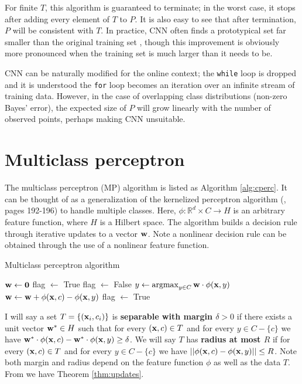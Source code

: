 \documentclass[preprint]{elsarticle}
\newcommand{\R}{ \mbox{${\mathbb R}$}}
\newcommand{\argmax}{\operatornamewithlimits{argmax}}
\begin{document}
For finite $T$, this algorithm is guaranteed to terminate; in the worst case, it stops after adding every element of $T$ to $P$. It is also easy to see that after termination, $P$ will be consistent with $T$. In practice, CNN often finds a prototypical set far smaller than the original training set \cite{Angiulli}\cite{Wilson}, though this improvement is obviously more pronounced when the training set is much larger than it needs to be.

CNN can be naturally modified for the online context; the \texttt{while} loop is dropped and it is understood the \texttt{for} loop becomes an iteration over an infinite stream of training data. However, in the case of overlapping class distributions (non-zero Bayes' error), the expected size of $P$ will grow linearly with the number of observed points, perhaps making CNN unsuitable.

\section{Multiclass perceptron}
The multiclass perceptron (MP) algorithm \cite{CollinsPerceptron} is listed as Algorithm \ref{alg:cperc}. It can be thought of as a generalization of the kernelized perceptron algorithm (\cite{bishop-2006}, pages 192-196) to handle multiple classes. Here, $\phi:\R^d \times C \rightarrow H$ is an arbitrary feature function, where $H$ is a Hilbert space. The algorithm builds a decision rule through iterative updates to a vector ${\bf w}$. Note a nonlinear decision rule can be obtained through the use of a nonlinear feature function.

\begin{algorithm}
\caption{Multiclass perceptron algorithm}
\label{alg:cperc}
\begin{algorithmic}
\STATE ${\bf w} \leftarrow {\bf 0}$
\STATE flag $\leftarrow$ True
\STATE flag $\leftarrow$ False
	\STATE $y \gets \argmax_{y \in C} {\bf w} \cdot \phi({\bf x},y)$
		\STATE ${\bf w} \leftarrow {\bf w} + \phi({\bf x},c)-\phi({\bf x},y)$
		\STATE flag $\leftarrow$ True
	\ENDIF
\ENDFOR
\ENDWHILE
\end{algorithmic}
\end{algorithm}

I will say a set $T=\{({\bf x}_i,c_i)\}$ is \textbf{separable with margin $\delta > 0$} if there exists a unit vector ${\bf w}^* \in H$ such that for every $({\bf x},c) \in T$ and for every $y \in C-\{c\}$ we have ${\bf w}^* \cdot \phi({\bf x},c) - {\bf w}^* \cdot \phi({\bf x},y) \geq \delta$. We will say $T$ has \textbf{radius at most $R$} if for every $({\bf x},c) \in T$ and for every $y \in C-\{c\}$ we have $||\phi({\bf x},c) - \phi({\bf x},y)|| \leq R$. Note both margin and radius depend on the feature function $\phi$ as well as the data $T$. From \cite{CollinsPerceptron} we have Theorem \ref{thm:updates}.
\end{document}
